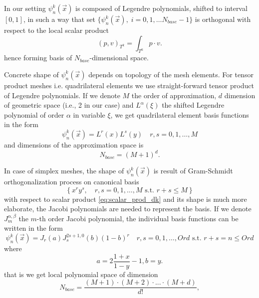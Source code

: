 In our setting $\psi_n^k(\vec{x})$ is composed of Legendre polynomials, shifted 
to interval $[0, 1]$, in such a way that set $\{\psi_n^k(\vec{x}),\; i = 0,1, 
\dots  N_{base} - 1\}$ is orthogonal with respect to the local scalar product
\begin{equation}
	\label{eq:scalar_prod_dk}
	(p, v)_{T^k} = \int_{T^k} p \cdot v.
\end{equation}
hence forming basis of $N_{base}$-dimensional space. 


Concrete shape of $\psi_n^k(\vec{x})$ depends on topology of the mesh elements. For 
tensor product meshes i.e. quadrilateral elements we use straight-forward 
tensor product of Legendre polynomials. If we denote $M$ the order of 
approximation, $d$ dimension of geometric space (i.e., 2 in our case) and $L^\alpha(\xi)$ 
the shifted Legendre polynomial of order $\alpha$ in variable $\xi$, we get 
quadrilateral element basis functions in the form
\begin{equation}
\psi_n^k(\vec{x}) = L^r(x)L^s(y)\quad r, s = 0,1, \dots, M
\end{equation}
and dimensions of the approximation space is
\begin{equation}
	N_{base} = (M + 1)^d.
\end{equation}


In case of simplex meshes, the shape of $\psi_n^k(\vec{x})$ is result of 
Gram-Schmidt orthogonalization process on canonical basis 
$$
\left\{ x^ry^s,  \quad r, s = 0,1, \dots, M \text{ s.t. } r + s \leq M\right\}
$$
with respect to scalar product \eqref{eq:scalar_prod_dk}
and its shape is much more elaborate, the Jacobi polynomials are needed to 
represent the basis. If we denote $J^{\alpha, \beta}_m$ the $m$-th order 
Jacobi polynomial, the individual basis functions can be written in the form 
\cite{Hesthaven2008}
\begin{equation}
	\psi_n^k(\vec{x}) = J_r(a)J^{2s+1, 0}_s(b)(1 - b)^r\quad r, s = 0,1, \dots, 
	Ord \text{ s.t. } r + s = n \leq Ord
\end{equation}
where
\begin{equation}
	a = 2 \frac{1 + x}{1 - y} - 1, b = y.
\end{equation}
that is we get local polynomial space of dimension
\begin{equation}
N_{base} =  \frac{(M + 1) \cdot (M + 2) \cdot ... \cdot (M + d)}{d!},
\end{equation}

